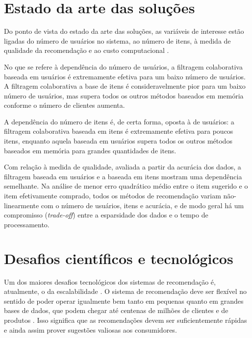\section{Estado da arte das soluções} %
\label{sec:estado_da_arte_das_solu_es}

Do ponto de vista do estado da arte das soluções, as variáveis de interesse estão ligadas do número de usuários no sistema, ao número de itens, à medida de qualidade da recomendação e ao custo computacional \cite{lee2012comparative}.

No que se refere à dependência do número de usuários, a filtragem colaborativa baseada em usuários é extremamente efetiva para um baixo número de usuários. A filtragem colaborativa a base de itens é consideravelmente pior para um baixo número de usuários, mas supera todos os outros métodos baseados em memória conforme o número de clientes aumenta.

A dependência do número de itens é, de certa forma, oposta à de usuários: a filtragem colaborativa baseada em itens é extremamente efetiva para poucos itens, enquanto aquela baseada em usuários supera todos os outros métodos baseados em memória para grandes quantidades de itens.

Com relação à medida de qualidade, avaliada a partir da acurácia dos dados, a filtragem baseada em usuários e a baseada em itens mostram uma dependência semelhante. Na análise de menor erro quadrático médio entre o item sugerido e o item efetivamente comprado, todos os métodos de recomendação variam não-linearmente com o número de usuários, itens e acurácia, e de modo geral há um compromisso (\textit{trade-off}) entre a esparsidade dos dados e o tempo de processamento. 

\section{Desafios científicos e tecnológicos} %
\label{sec:desafios_cient_ficos_e_tecnol_gicos}

Um dos maiores desafios tecnológicos dos sistemas de recomendação é, atualmente, o da escalabilidade \cite{wei2007survey}. O sistema de recomendação deve ser flexível no sentido de poder operar igualmente bem tanto em pequenas quanto em grandes bases de dados, que podem chegar até centenas de milhões de clientes \cite{amazoncustomers} e de produtos \cite{amazonproducts}. Isso significa que as recomendações devem ser suficientemente rápidas e ainda assim prover sugestões valiosas aos consumidores. 

